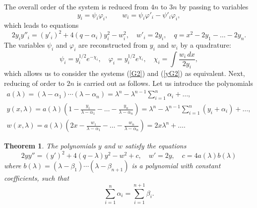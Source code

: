 \documentclass[11pt]{article}
\theoremstyle{plain}
\newtheorem{theorem}[proposition]{Theorem}
\theoremstyle{definition}
\begin{document}
The overall order of the system is reduced from $4n$ to $3n$ by passing to variables
\[
 y_i=\psi_i\varphi_i,\qquad w_i=\psi_i\varphi'_i-\psi'_i\varphi_i,
\]
which leads to equations
\begin{equation}\label{yG2}
 2y_iy''_i=(y'_i)^2+4(q-\alpha_i)y^2_i-w^2_i,\quad w'_i=2y_i,\quad q=x^2-2y_1-\dots-2y_n.
\end{equation}
The variables $\psi_i$ and $\varphi_i$ are reconstructed from $y_i$ and $w_i$ by a quadrature:
\[
 \psi_i= y^{1/2}_ie^{-\chi_i},\quad \varphi_i= y^{1/2}_ie^{\chi_i},\quad \chi_i=\int\frac{w_i\,dx}{2y_i},
\]
which allows us to consider the systems (\ref{G2}) and (\ref{yG2}) as equivalent. Next, reducing of order to $2n$ is carried out as follows. Let us introduce the polynomials
\begin{gather*}
 a(\lambda)=(\lambda-\alpha_1)\cdots(\lambda-\alpha_n)
  =\lambda^n-\lambda^{n-1}\sum^n_{i=1}\alpha_i+\dotsc,\\
 y(x,\lambda)=a(\lambda)\left(1-\frac{y_1}{\lambda-\alpha_1}
     -\dots-\frac{y_n}{\lambda-\alpha_n}\right)
  =\lambda^n-\lambda^{n-1}\sum^n_{i=1}(y_i+\alpha_i)+\dotsc,\\ 
 w(x,\lambda)=a(\lambda)\left(2x-\frac{w_1}{\lambda-\alpha_1}
     -\dots-\frac{w_n}{\lambda-\alpha_n}\right)
  =2x\lambda^n+\dotso. 
\end{gather*}

\begin{theorem}
The polynomials $y$ and $w$ satisfy the equations
\begin{equation}\label{ywc}
 2yy''=(y')^2+4(q-\lambda)y^2-w^2+c,\quad w'=2y,\quad c=4a(\lambda)b(\lambda)
\end{equation}
where $b(\lambda)=(\lambda-\beta_1)\cdots(\lambda-\beta_{n+1})$ is a polynomial with constant coefficients, such that
\begin{equation}\label{ab}
 \sum^n_{i=1}\alpha_i=\sum^{n+1}_{i=1}\beta_i.
\end{equation}
\end{theorem}
\end{document}
